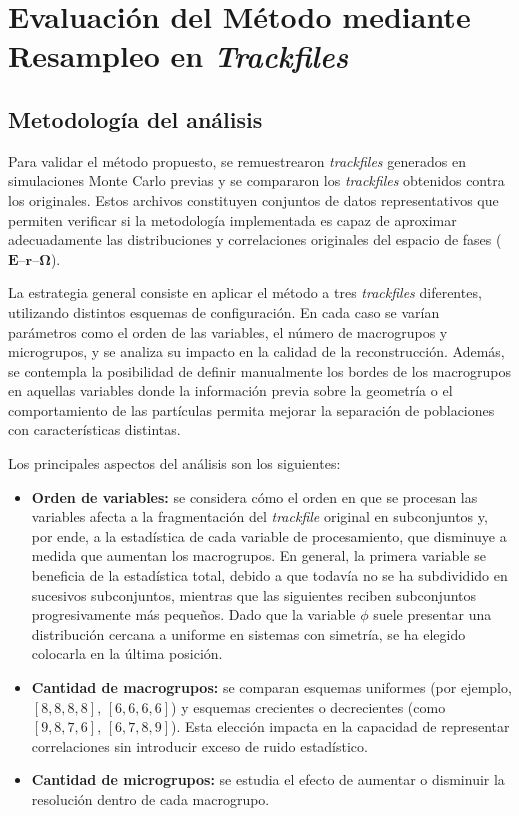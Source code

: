 \chapter{Evaluación del Método mediante Resampleo en \emph{Trackfiles}}
\label{chap:evaluacion-trackfiles}

\section{Metodología del análisis}
\label{sec:metodologia-analisis}

Para validar el método propuesto, se remuestrearon \emph{trackfiles} generados en simulaciones Monte Carlo previas y se compararon los \emph{trackfiles} obtenidos contra los originales. Estos archivos constituyen conjuntos de datos representativos que permiten verificar si la metodología implementada es capaz de aproximar adecuadamente las distribuciones y correlaciones originales del espacio de fases ($\mathbf{E}$–$\mathbf{r}$–$\boldsymbol{\Omega}$).

La estrategia general consiste en aplicar el método a tres \emph{trackfiles} diferentes, utilizando distintos esquemas de configuración. En cada caso se varían parámetros como el orden de las variables, el número de macrogrupos y microgrupos, y se analiza su impacto en la calidad de la reconstrucción. Además, se contempla la posibilidad de definir manualmente los bordes de los macrogrupos en aquellas variables donde la información previa sobre la geometría o el comportamiento de las partículas permita mejorar la separación de poblaciones con características distintas.

Los principales aspectos del análisis son los siguientes:

\begin{itemize}
    \item \textbf{Orden de variables:} se considera cómo el orden en que se procesan las variables afecta a la fragmentación del \emph{trackfile} original en subconjuntos y, por ende, a la estadística de cada variable de procesamiento, que disminuye a medida que aumentan los macrogrupos. En general, la primera variable se beneficia de la estadística total, debido a que todavía no se ha subdividido en sucesivos subconjuntos, mientras que las siguientes reciben subconjuntos progresivamente más pequeños. Dado que la variable $\phi$ suele presentar una distribución cercana a uniforme en sistemas con simetría, se ha elegido colocarla en la última posición.
    
    \item \textbf{Cantidad de macrogrupos:} se comparan esquemas uniformes (por ejemplo, $[8,8,8,8]$, $[6,6,6,6]$) y esquemas crecientes o decrecientes (como $[9,8,7,6]$, $[6,7,8,9]$). Esta elección impacta en la capacidad de representar correlaciones sin introducir exceso de ruido estadístico.
    
    \item \textbf{Cantidad de microgrupos:} se estudia el efecto de aumentar o disminuir la resolución dentro de cada macrogrupo.
\end{itemize}

